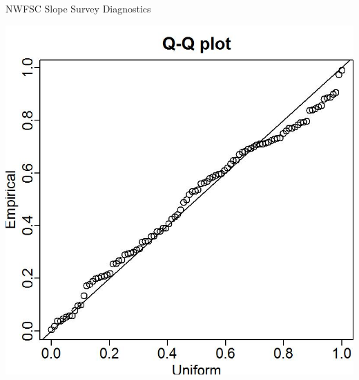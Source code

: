 \documentclass[pdf]{beamer}\usepackage[]{graphicx}\usepackage[]{color}
\begin{document}
\begin{frame}{NWFSC Slope Survey Diagnostics}
  \begin{center}
  \includegraphics[scale = 0.50]{figures/NW_Slope_Q-Q_plot.jpg}
  \end{center}
\end{frame}
\end{document}
